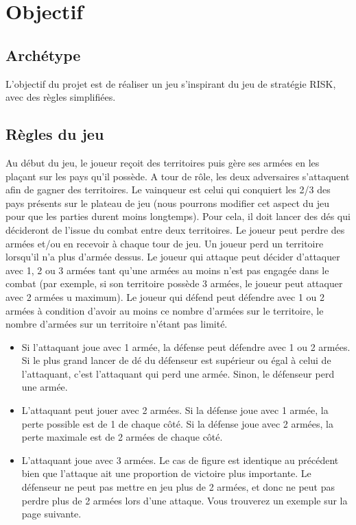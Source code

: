 \section{Objectif}

\subsection{Archétype}
    L'objectif du projet est de réaliser un jeu s'inspirant du jeu de stratégie RISK, avec des règles simplifiées.
    
\subsection{Règles du jeu}
    Au début du jeu, le joueur reçoit des territoires puis gère ses armées en les plaçant sur les pays qu'il possède. A tour de rôle, les deux adversaires s'attaquent afin de gagner des territoires. Le vainqueur est celui qui conquiert les 2/3 des pays présents sur le plateau de jeu (nous pourrons modifier cet aspect du jeu pour que les parties durent moins longtemps). Pour cela, il doit lancer des dés qui décideront de l'issue du combat entre deux territoires. Le joueur peut perdre des armées et/ou en recevoir à chaque tour de jeu. Un joueur perd un territoire lorsqu'il n'a plus d'armée dessus. 
    \newline
    \newline
    Le joueur qui attaque peut décider d'attaquer avec 1, 2 ou 3 armées tant qu'une armées au moins n'est pas engagée dans le combat (par exemple, si son territoire possède 3 armées, le joueur peut attaquer avec 2 armées u maximum). Le joueur qui défend peut défendre avec 1 ou 2 armées à condition d'avoir au moins ce nombre d'armées sur le territoire, le nombre d'armées sur un territoire n'étant pas limité.
    \begin{itemize}
        \item Si l'attaquant joue avec 1 armée, la défense peut défendre avec 1 ou 2 armées. Si le plus grand lancer de dé du défenseur est supérieur ou égal à celui de l'attaquant, c'est l'attaquant qui perd une armée. Sinon, le défenseur perd une armée. 
        \item L'attaquant peut jouer avec 2 armées. Si la défense joue avec 1 armée, la perte possible est de 1 de chaque côté. Si la défense joue avec 2 armées, la perte maximale est de 2 armées de chaque côté. 
        \item L'attaquant joue avec 3 armées. Le cas de figure est identique au précédent bien que l'attaque ait une proportion de victoire plus importante. Le défenseur ne peut pas mettre en jeu plus de 2 armées, et donc ne peut pas perdre plus de 2 armées lors d'une attaque. Vous trouverez un exemple sur la page suivante. 
        \newline
        \newline
    \end{itemize}

